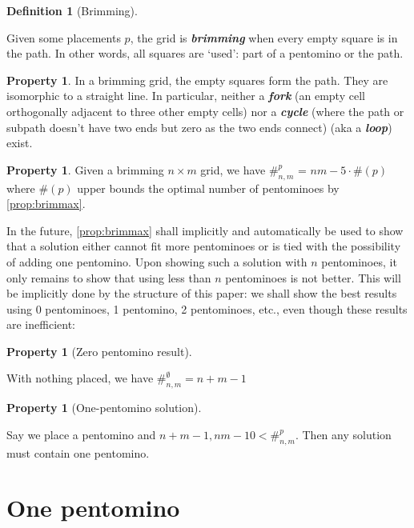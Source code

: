\documentclass{article}
\theoremstyle{definition}%
\newtheorem{definition}[theorem]{Definition}
\newtheorem{property}[theorem]{Property}
\newcommand{\newterm}[1]{\textbf{\textit{#1}}}
\begin{document}
\begin{definition}[Brimming]
\label{def:brimming}

Given some placements $p$, the grid is \newterm{brimming} when every empty square is in the path. In other words, all squares are `used': part of a pentomino or the path.
\end{definition}

\begin{property}\label{prop:brimline}
In a brimming grid, the empty squares form the path. They are isomorphic to a straight line. In particular, neither a \newterm{fork} (an empty cell orthogonally adjacent to three other empty cells) nor a \newterm{cycle} (where the path or subpath doesn't have two ends but zero as the two ends connect) (aka a \newterm{loop}) exist.
\end{property}

\begin{property}
Given a brimming $n \times m$ grid, we have $\#^{p}_{n, m}$ = $nm - 5 \cdot \#(p)$ where $\#(p)$ upper bounds the optimal number of pentominoes by \cref{prop:brimmax}.
\end{property}

In the future, \cref{prop:brimmax} shall implicitly and automatically be used to show that
a solution either cannot fit more pentominoes or is tied with the possibility of
adding one pentomino. Upon showing such a solution with $n$ pentominoes,
it only remains to show that using less than $n$ pentominoes is not better.
This will be implicitly done by the structure of this paper: we shall show the best results
using 0 pentominoes, 1 pentomino, 2 pentominoes, etc., even though these results are inefficient:

\begin{property}[Zero pentomino result]
\label{prop:zeroplace}

With nothing placed, we have $\#^{\emptyset}_{n, m} = n + m - 1$
\end{property}

\begin{property}[One-pentomino solution]
\label{prop:oneplace}

Say we place a pentomino and $n + m - 1, nm - 10 < \#^p_{n, m}$. Then any solution must contain one pentomino.
\end{property}




\clearpage
\section{One pentomino}\label{sec:3}
\end{document}

